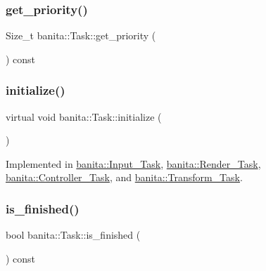 \mbox{\label{classbanita_1_1_task_a8b798d792fefb09525e48eb836a8cbb7}} 
\subsubsection{\texorpdfstring{get\_priority()}{get\_priority()}}
{\footnotesize\ttfamily Size\+\_\+t banita\+::\+Task\+::get\+\_\+priority (\begin{DoxyParamCaption}{ }\end{DoxyParamCaption}) const\hspace{0.3cm}{\ttfamily [inline]}}

\mbox{\label{classbanita_1_1_task_a34578cdd41899a338ac09fec3a285487}} 
\subsubsection{\texorpdfstring{initialize()}{initialize()}}
{\footnotesize\ttfamily virtual void banita\+::\+Task\+::initialize (\begin{DoxyParamCaption}{ }\end{DoxyParamCaption})\hspace{0.3cm}{\ttfamily [pure virtual]}}



Implemented in \mbox{\hyperlink{classbanita_1_1_input___task_a3f7f72ab848a23a92c3351426b3595c9}{banita\+::\+Input\+\_\+\+Task}}, \mbox{\hyperlink{classbanita_1_1_render___task_a34f649b5ad434cf7f6bb04604173afed}{banita\+::\+Render\+\_\+\+Task}}, \mbox{\hyperlink{classbanita_1_1_controller___task_a87990651d658eb3d26a9b8526e600fd7}{banita\+::\+Controller\+\_\+\+Task}}, and \mbox{\hyperlink{classbanita_1_1_transform___task_ab94871acd76fbde7de99755cd6ac4e49}{banita\+::\+Transform\+\_\+\+Task}}.

\mbox{\label{classbanita_1_1_task_a46dfe5e26db0311f2a4bc7630bc0e2b7}} 
\subsubsection{\texorpdfstring{is\_finished()}{is\_finished()}}
{\footnotesize\ttfamily bool banita\+::\+Task\+::is\+\_\+finished (\begin{DoxyParamCaption}{ }\end{DoxyParamCaption}) const\hspace{0.3cm}{\ttfamily [inline]}}

